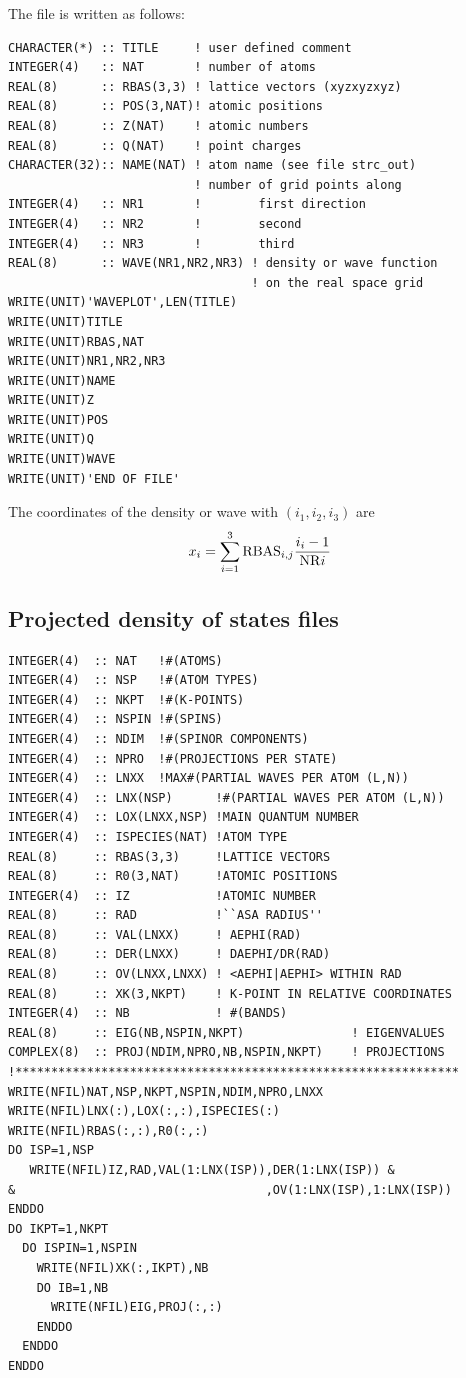 \documentclass[final,12pt]{article}
\begin{document}
{{{The file is written as follows:
\small{
\begin{verbatim}
CHARACTER(*) :: TITLE     ! user defined comment
INTEGER(4)   :: NAT       ! number of atoms
REAL(8)      :: RBAS(3,3) ! lattice vectors (xyzxyzxyz)
REAL(8)      :: POS(3,NAT)! atomic positions
REAL(8)      :: Z(NAT)    ! atomic numbers 
REAL(8)      :: Q(NAT)    ! point charges
CHARACTER(32):: NAME(NAT) ! atom name (see file strc_out)
                          ! number of grid points along 
INTEGER(4)   :: NR1       !        first direction
INTEGER(4)   :: NR2       !        second
INTEGER(4)   :: NR3       !        third
REAL(8)      :: WAVE(NR1,NR2,NR3) ! density or wave function 
                                  ! on the real space grid
WRITE(UNIT)'WAVEPLOT',LEN(TITLE)
WRITE(UNIT)TITLE
WRITE(UNIT)RBAS,NAT
WRITE(UNIT)NR1,NR2,NR3
WRITE(UNIT)NAME
WRITE(UNIT)Z
WRITE(UNIT)POS
WRITE(UNIT)Q
WRITE(UNIT)WAVE
WRITE(UNIT)'END OF FILE'
\end{verbatim}
}

The coordinates of the density or wave with $(i_1,i_2,i_3)$ are 
\begin{equation}
  x_i=\sum_{i=1}^{3} {\rm RBAS}_{i,j}{{i_i-1}\over{{\rm NR}i}} 
\end{equation}

\subsection{Projected density of states files}
\begin{verbatim}
INTEGER(4)  :: NAT   !#(ATOMS)
INTEGER(4)  :: NSP   !#(ATOM TYPES)
INTEGER(4)  :: NKPT  !#(K-POINTS)
INTEGER(4)  :: NSPIN !#(SPINS)
INTEGER(4)  :: NDIM  !#(SPINOR COMPONENTS)
INTEGER(4)  :: NPRO  !#(PROJECTIONS PER STATE)
INTEGER(4)  :: LNXX  !MAX#(PARTIAL WAVES PER ATOM (L,N))
INTEGER(4)  :: LNX(NSP)      !#(PARTIAL WAVES PER ATOM (L,N))
INTEGER(4)  :: LOX(LNXX,NSP) !MAIN QUANTUM NUMBER
INTEGER(4)  :: ISPECIES(NAT) !ATOM TYPE
REAL(8)     :: RBAS(3,3)     !LATTICE VECTORS
REAL(8)     :: R0(3,NAT)     !ATOMIC POSITIONS 
INTEGER(4)  :: IZ            !ATOMIC NUMBER
REAL(8)     :: RAD           !``ASA RADIUS''
REAL(8)     :: VAL(LNXX)     ! AEPHI(RAD)
REAL(8)     :: DER(LNXX)     ! DAEPHI/DR(RAD)
REAL(8)     :: OV(LNXX,LNXX) ! <AEPHI|AEPHI> WITHIN RAD
REAL(8)     :: XK(3,NKPT)    ! K-POINT IN RELATIVE COORDINATES
INTEGER(4)  :: NB            ! #(BANDS)
REAL(8)     :: EIG(NB,NSPIN,NKPT)               ! EIGENVALUES
COMPLEX(8)  :: PROJ(NDIM,NPRO,NB,NSPIN,NKPT)    ! PROJECTIONS
!**************************************************************
WRITE(NFIL)NAT,NSP,NKPT,NSPIN,NDIM,NPRO,LNXX
WRITE(NFIL)LNX(:),LOX(:,:),ISPECIES(:)
WRITE(NFIL)RBAS(:,:),R0(:,:)
DO ISP=1,NSP
   WRITE(NFIL)IZ,RAD,VAL(1:LNX(ISP)),DER(1:LNX(ISP)) &
&                                   ,OV(1:LNX(ISP),1:LNX(ISP))
ENDDO
DO IKPT=1,NKPT
  DO ISPIN=1,NSPIN
    WRITE(NFIL)XK(:,IKPT),NB
    DO IB=1,NB
      WRITE(NFIL)EIG,PROJ(:,:)
    ENDDO
  ENDDO
ENDDO
\end{verbatim}


}}}
\end{document}

